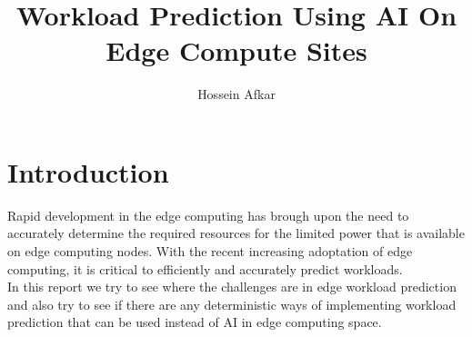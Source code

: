 \documentclass[a4paper, 11pt]{article}
\title{Workload Prediction Using AI On Edge Compute Sites}
\author{Hossein Afkar}
\theoremstyle{nonumberplain}
\begin{document}
\maketitle

\section{Introduction}
Rapid development in the edge computing has brough upon the need to
accurately determine the required resources for the limited power that is
available on edge computing nodes. With the recent increasing adoptation
of edge computing, it is critical to efficiently and accurately predict
workloads. \\
In this report we try to see where the challenges are in edge workload
prediction and also try to see if there are any
deterministic ways of implementing workload prediction
that can be used instead of AI in edge computing space.
\end{document}
